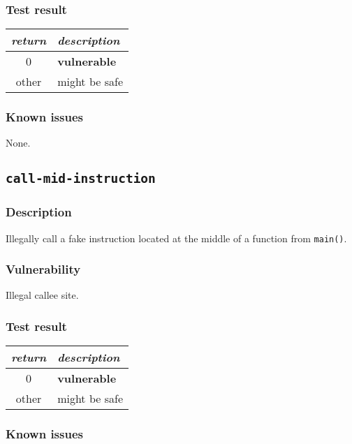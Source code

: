 \documentclass[a4paper]{book}
\begin{document}
\subsubsection{Test result}
\begin{tabular}{cl}
  \toprule
  \emph{return}  & \emph{description} \\
  \midrule
  0              & \textbf{vulnerable} \\
  other          & might be safe \\
  \bottomrule
\end{tabular}
  
\subsubsection{Known issues}

None.

\newpage
\subsection{\texttt{call-mid-instruction}}\label{test-call-mid-instruction}

\subsubsection{Description}
Illegally call a fake instruction located at the middle of a function from \texttt{main()}.

\subsubsection{Vulnerability}
Illegal callee site.

\subsubsection{Test result}
\begin{tabular}{cl}
  \toprule
  \emph{return}  & \emph{description} \\
  \midrule
  0              & \textbf{vulnerable} \\
  other          & might be safe \\
  \bottomrule
\end{tabular}
  
\subsubsection{Known issues}
\end{document}
